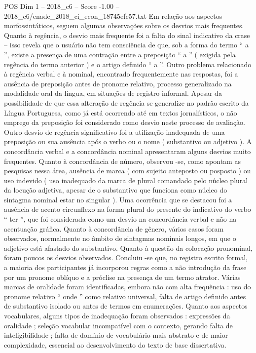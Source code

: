 \begin{textsample}{POS Dim 1 – 2018\_c6 – Score -1.00 – 2018\_c6/enade\_2018\_ci\_econ\_18745efc57.txt}
Em relação aos aspectos morfossintáticos, seguem algumas observações sobre os desvios mais frequentes.
Quanto à regência, o desvio mais frequente foi a falta do sinal indicativo da crase – isso revela que o usuário não tem consciência de que, sob a forma do termo “ a ”, existe a presença de uma contração entre a preposição “ a ” ( exigida pela regência do termo anterior ) e o artigo definido “ a ”.
Outro problema relacionado à regência verbal e à nominal, encontrado frequentemente nas respostas, foi a ausência de preposição antes de pronome relativo, processo generalizado na modalidade oral da língua, em situações de registro informal.
Apesar da possibilidade de que essa alteração de regência se generalize no padrão escrito da Língua Portuguesa, como já está ocorrendo até em textos jornalísticos, o não emprego da preposição foi considerado como desvio neste processo de avaliação.
Outro desvio de regência significativo foi a utilização inadequada de uma preposição ou sua ausência após o verbo ou o nome ( substantivo ou adjetivo ).
A concordância verbal e a concordância nominal apresentaram alguns desvios muito frequentes.
Quanto à concordância de número, observou -se, como apontam as pesquisas nessa área, ausência de marca ( com sujeito anteposto ou posposto ) ou uso indevido ( uso inadequado da marca de plural comandado pelo núcleo plural da locução adjetiva, apesar de o substantivo que funciona como núcleo do sintagma nominal estar no singular ).
Uma ocorrência que se destacou foi a ausência de acento circunflexo na forma plural do presente do indicativo do verbo “ ter ”, que foi considerada como um desvio na concordância verbal e não na acentuação gráfica.
Quanto à concordância de gênero, vários casos foram observados, normalmente no âmbito de sintagmas nominais longos, em que o adjetivo está afastado do substantivo.
Quanto à questão da colocação pronominal, foram poucos os desvios observados.
Concluiu -se que, no registro escrito formal, a maioria dos participantes já incorporou regras como a não introdução da frase por um pronome oblíquo e a próclise na presença de um termo atrator.
Várias marcas de oralidade foram identificadas, embora não com alta frequência : uso do pronome relativo “ onde ” como relativo universal, falta de artigo definido antes de substantivo isolado ou antes de termos em enumerações.
Quanto aos aspectos vocabulares, alguns tipos de inadequação foram observados : expressões da oralidade ; seleção vocabular incompatível com o contexto, gerando falta de inteligibilidade ; falta de domínio de vocabulário mais abstrato e de maior complexidade, essencial ao desenvolvimento do texto de base dissertativa.

\end{textsample}
